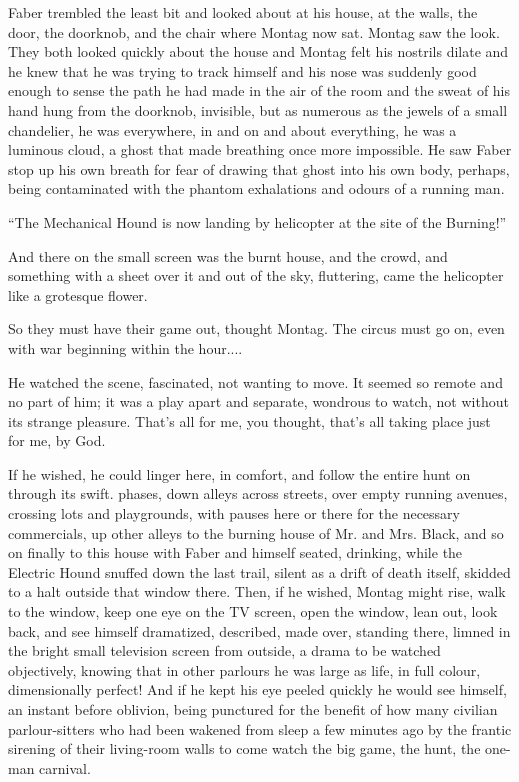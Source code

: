 \documentclass[11pt,openany]{book}
\begin{document}
Faber trembled the least bit and looked about at his house, at the walls, the door, the doorknob, and the chair where Montag now sat. Montag saw the look. They both looked quickly about the house and Montag felt his nostrils dilate and he knew that he was trying to track himself and his nose was suddenly good enough to sense the path he had made in the air of the room and the sweat of his hand hung from the doorknob, invisible, but as numerous as the jewels of a small chandelier, he was everywhere, in and on and about everything, he was a luminous cloud, a ghost that made breathing once more impossible. He saw Faber stop up his own breath for fear of drawing that ghost into his own body, perhaps, being contaminated with the phantom exhalations and odours of a running man.

``The Mechanical Hound is now landing by helicopter at the site of the Burning!''

And there on the small screen was the burnt house, and the crowd, and something with a sheet over it and out of the sky, fluttering, came the helicopter like a grotesque flower.

So they must have their game out, thought Montag. The circus must go on, even with war beginning within the hour....

He watched the scene, fascinated, not wanting to move. It seemed so remote and no part of him; it was a play apart and separate, wondrous to watch, not without its strange pleasure. That's all for me, you thought, that's all taking place just for me, by God.

If he wished, he could linger here, in comfort, and follow the entire hunt on through its swift. phases, down alleys across streets, over empty running avenues, crossing lots and playgrounds, with pauses here or there for the necessary commercials, up other alleys to the burning house of Mr. and Mrs. Black, and so on finally to this house with Faber and himself seated, drinking, while the Electric Hound snuffed down the last trail, silent as a drift of death itself, skidded to a halt outside that window there. Then, if he wished, Montag might rise, walk to the window, keep one eye on the TV screen, open the window, lean out, look back, and see himself dramatized, described, made over, standing there, limned in the bright small television screen from outside, a drama to be watched objectively, knowing that in other parlours he was large as life, in full colour, dimensionally perfect! And if he kept his eye peeled quickly he would see himself, an instant before oblivion, being punctured for the benefit of how many civilian parlour-sitters who had been wakened from sleep a few minutes ago by the frantic sirening of their living-room walls to come watch the big game, the hunt, the one-man carnival.
\end{document}
